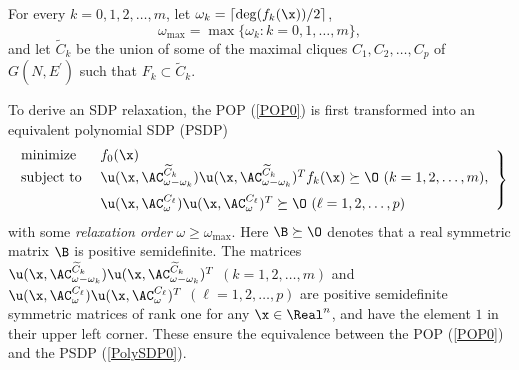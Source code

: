 For every $k=0,1,2,\ldots,m$, let
$\omega_k = \lceil \deg(f_k(\x)) / 2 \rceil$, 
\begin{equation}
\omega_{\max} = \max \{ \omega_k : k =0,1,\ldots,m \}, 
\label{omegaMax}
\end{equation}
and let $\widetilde{C}_k$ be the union of some of 
the maximal cliques $C_1, C_2,\ldots,C_p$ of $G(N,E^{\prime})$ 
such that $F_k \subset \widetilde{C}_k$. 

To derive an SDP relaxation, 
the POP  (\ref{POP0}) is first transformed  into  an equivalent polynomial SDP (PSDP)
\begin{equation}
\left.
\begin{array}{lll}
\mbox{minimize } & f_0(\x) \\
\mbox{subject to } &  \u(\x,\AC^{\widetilde{C}_k}_{\omega-\omega_k})
    \u(\x,\AC^{\widetilde{C}_k}_{\omega-\omega_k})^T f_k(\x)
\succeq \O 
\ (k=1,2,\ldots,m), \vspace{0.2cm} \\
& \u(\x,\AC^{C_{\ell}}_{\omega}) \u(\x,\AC^{C_{\ell}}_{\omega})^T
\succeq \O 
\ (\ell=1,2,\ldots,p)
\end{array}
\right\} \label{PolySDP0}
\end{equation}
with  some {\it relaxation order}  $\omega \geq \omega_{\max}$. 
Here $\B \succeq \O$ denotes that a real symmetric matrix $\B$ 
is positive semidefinite. 
The matrices $\u(\x,\AC^{\widetilde{C}_k}_{\omega-\omega_k})
    \u(\x,\AC^{\widetilde{C}_k}_{\omega-\omega_k})^T$ 
$(k=1,2,\ldots,m)$
and $\u(\x,\AC^{C_{\ell}}_{\omega}) \u(\x,\AC^{C_{\ell}}_{\omega})^T$
$(\ell=1,2,\ldots,p)$ are  positive semidefinite symmetric matrices of
rank one
for any $\x \in \Real^n$, and have  the element $1$ in their upper left corner.
These ensure the equivalence between the POP (\ref{POP0}) and
the PSDP (\ref{PolySDP0}). 

